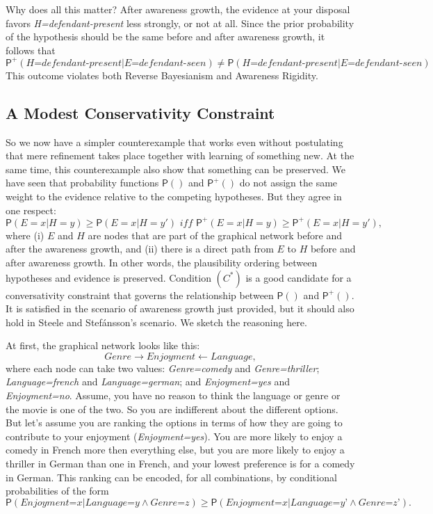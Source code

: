 \documentclass[
  11pt,
  dvipsnames,enabledeprecatedfontcommands]{scrartcl}
\newcommand{\pr}[1]{\ensuremath{\mathsf{P}(#1)}}
\newcommand{\ppr}[2]{\ensuremath{\mathsf{P}^{#1}(#2)}}
\begin{document}
Why does all this matter? After awareness growth, the evidence at your
disposal favors \textit{H=defendant-present} less strongly, or not at
all. Since the prior probability of the hypothesis should be the same
before and after awareness growth, it follows that
\[\ppr{+}{\textit{H=defendant-present} \vert \textit{E=defendant-seen}} \neq \pr{\textit{H=defendant-present} \vert \textit{E=defendant-seen}}\]
This outcome violates both Reverse Bayesianism and Awareness
Rigidity.

\hypertarget{a-modest-conservativity-constraint}{%
\subsection{A Modest Conservativity
Constraint}\label{a-modest-conservativity-constraint}}

So we now have a simpler counterexample that works even without
postulating that mere refinement takes place together with learning of
something new. At the same time, this counterexample also show that
something can be preserved. We have seen that probability functions
\(\pr{}\) and \(\ppr{+}{}\) do not assign the same weight to the
evidence relative to the competing hypotheses. But they agree in one
respect:
\[\pr{E=x \vert H=y} \geq \pr{E=x \vert H=y'} \textit{ iff } \ppr{+}{E=x \vert H=y} \geq \ppr{+}{E=x \vert H=y'} \tag{$C^*$},\]
where (i) \(E\) and \(H\) are nodes that are part of the graphical
network before and after the awareness growth, and (ii) there is a
direct path from \(E\) to \(H\) before and after awareness
growth. In other words,
the plausibility ordering between hypotheses and evidence is preserved.
Condition \((C^*)\) is a good candidate for a conversativity constraint
that governs the relationship between \(\pr{}\) and \(\ppr{+}{}\). It is
satisfied in the scenario of awareness growth just provided, but it
should also hold in Steele and Stefánsson's scenario. We sketch the
reasoning here.

At first, the graphical network looks like this:
\[\textit{Genre} \rightarrow \textit{Enjoyment} \leftarrow \textit{Language},\]
where each node can take two values: \textit{Genre=comedy} and
\textit{Genre=thriller}; \textit{Language=french} and
\textit{Language=german}; and \textit{Enjoyment=yes} and
\textit{Enjoyment=no}. Assume, you have no reason to think the language
or genre or the movie is one of the two. So you are indifferent about
the different options. But let's assume you are ranking the options in
terms of how they are going to contribute to your enjoyment
(\textit{Enjoyment=yes}). You are more likely to enjoy a comedy in
French more then everything else, but you are more likely to enjoy a
thriller in German than one in French, and your lowest preference is for
a comedy in German. This ranking can be encoded, for all combinations,
by conditional probabilities of the form
\[\pr{\textit{Enjoyment=x} \vert \textit{Language=y} \wedge \textit{Genre=z}} \geq \pr{\textit{Enjoyment=x} \vert \textit{Language=y'} \wedge \textit{Genre=z'}}.\]
\end{document}
